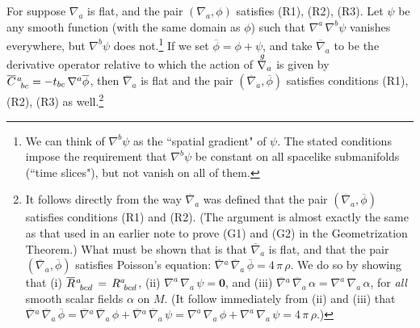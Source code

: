 \documentclass [12] {article}
\theoremstyle{plain}
\numberwithin{figure}{subsection}
\numberwithin{proposition}{subsection}
\begin{document}
For suppose  $\nabla_a$ is flat, and the pair $(\nabla_a, \phi)$ satisfies (R1), (R2), (R3). Let  $\psi$ be any smooth function (with the same domain as $\phi$) such that $\nabla^a \, \nabla^b \psi$ vanishes everywhere, but $\nabla^b\psi $ does not.\footnote{We can think of $\nabla^b\psi $ as the ``spatial gradient" of $\psi$. The stated conditions impose the requirement that $\nabla^b\psi $ be constant on all spacelike submanifolds (``time slices"), but  not vanish on all of them.}  If we set $\overline{\phi} = \phi + \psi$, and take $\overline{\nabla}_a$ to be the derivative operator relative  to which the action of $\stackrel{g \hspace{.4em}}{\nabla_a}$ is given by  $\overline{C}\hspace{.1em}^a_{\ bc}  = - t_{bc} \, \nabla^a \overline{\phi}$, then $\overline{\nabla}_a$ is flat and the pair $(\overline{\nabla}_a, \overline{\phi})$ satisfies conditions (R1),  (R2), (R3) as well.\nopagebreak[3]\footnote{It follows directly from the way $\overline{\nabla}_a$ was defined that the pair $(\overline{\nabla}_a, \overline{\phi})$ satisfies conditions (R1) and (R2). (The argument is almost exactly the same as that used in an earlier note to prove (G1) and (G2) in the Geometrization Theorem.) What must be shown that is that  $\overline{\nabla}_a$ is flat, and that the pair $(\overline{\nabla}_a, \overline{\phi})$ satisfies Poisson's equation:  $\overline{\nabla}{}^a \, \overline{\nabla}_a \, \overline{\phi} =  4  \, \pi  \, \rho$.
We do so by showing that  (i) $\overline{R}\hspace{.1em}^a_{\ bcd} \, = \,  R^a_{\ bcd}$, (ii) $\nabla^a \, \nabla_a  \, \psi =  \mathbf{0}$,  and  (iii) $ \overline{\nabla}{}^a \, \overline{\nabla}_a \, \alpha   =  \nabla^a \, \nabla_a \, \alpha$, for \emph{all} smooth scalar fields $\alpha$ on  $M$. (It follow immediately from (ii) and (iii) that 
$\overline{\nabla}{}^a \, \overline{\nabla}_a \, \overline{\phi} = \overline{\nabla}{}^a \, \overline{\nabla}_a \, \phi + \overline{\nabla}{}^a \, \overline{\nabla}_a \, \psi =  \nabla^a \, \nabla_a  \, \phi  +  \nabla^a \, \nabla_a  \, \psi =  4  \, \pi  \, \rho$.) 

}
\end{document}
